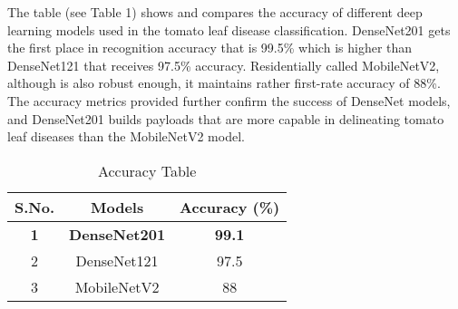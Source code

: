 \documentclass[12pt, English]{article}
\begin{document}
\begin{normalsize}






The table (see Table 1) shows and compares the accuracy of different deep learning models used in the tomato leaf disease classification. DenseNet201 gets the first place in recognition accuracy that is 99.5\% which is higher than DenseNet121 that receives 97.5\% accuracy. Residentially called MobileNetV2, although is also robust enough, it maintains rather first-rate accuracy of 88\%. The accuracy metrics provided further confirm the success of DenseNet models, and DenseNet201 builds payloads that are more capable in delineating tomato leaf diseases than the MobileNetV2 model. \\

\begin{table}[htbp]
  \centering
  \renewcommand{\thetable}{6.1}
  \caption{Accuracy Table}
  \label{tab:accuracy}
  \begin{tabular}{|c|c|c|}
    \hline
    \textbf{S.No.} & \textbf{Models} & \textbf{Accuracy (\%)} \\
    \hline
    \textbf{1} & \textbf{DenseNet201} & \textbf{99.1} \\ 
    \hline
    2 & DenseNet121 & 97.5 \\
    \hline
    3 & MobileNetV2 & 88 \\
    \hline
  \end{tabular}
\end{table}



\end{normalsize}
\end{document}

